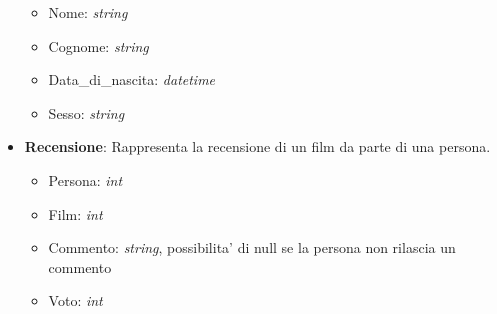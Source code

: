 \documentclass[10pt]{article}
\begin{document}
\begin{itemize}
\begin{itemize}
			\item Nome: \textit{string}
			\item Cognome: \textit{string}
			\item Data\_di\_nascita: \textit{datetime}	
			\item Sesso: \textit{string}
		\end{itemize}
		\item \textbf{Recensione}: Rappresenta la recensione di un film da parte di una persona.
		\begin{itemize}
			\item Persona: \textit{int}
			\item Film: \textit{int}
			\item Commento: \textit{string}, possibilita' di null se la persona non rilascia un commento
			\item Voto: \textit{int}
		\end{itemize}
	\end{itemize}
\end{document}
